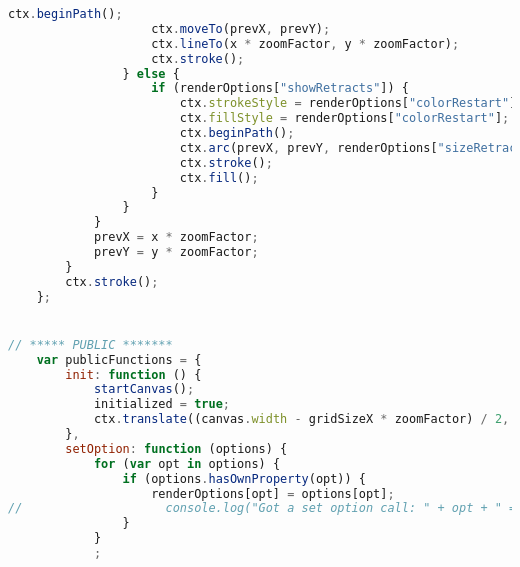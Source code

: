 \begin{lstlisting}[language=JavaScript, label={lst:renderFactory}, caption=When render frames are requested this file compiles the lines of gcode from the worker and sets up the rest of the canvas frames.]
                    ctx.beginPath();
                    ctx.moveTo(prevX, prevY);
                    ctx.lineTo(x * zoomFactor, y * zoomFactor);
                    ctx.stroke();
                } else {
                    if (renderOptions["showRetracts"]) {
                        ctx.strokeStyle = renderOptions["colorRestart"];
                        ctx.fillStyle = renderOptions["colorRestart"];
                        ctx.beginPath();
                        ctx.arc(prevX, prevY, renderOptions["sizeRetractSpot"], 0, Math.PI * 2, true);
                        ctx.stroke();
                        ctx.fill();
                    }
                }
            }
            prevX = x * zoomFactor;
            prevY = y * zoomFactor;
        }
        ctx.stroke();
    };


// ***** PUBLIC *******
    var publicFunctions = {
        init: function () {
            startCanvas();
            initialized = true;
            ctx.translate((canvas.width - gridSizeX * zoomFactor) / 2, gridSizeY * zoomFactor + (canvas.height - gridSizeY * zoomFactor) / 2);
        },
        setOption: function (options) {
            for (var opt in options) {
                if (options.hasOwnProperty(opt)) {
                    renderOptions[opt] = options[opt];
//                    console.log("Got a set option call: " + opt + " == " + options[opt]);
                }
            }
            ;


\end{lstlisting}
